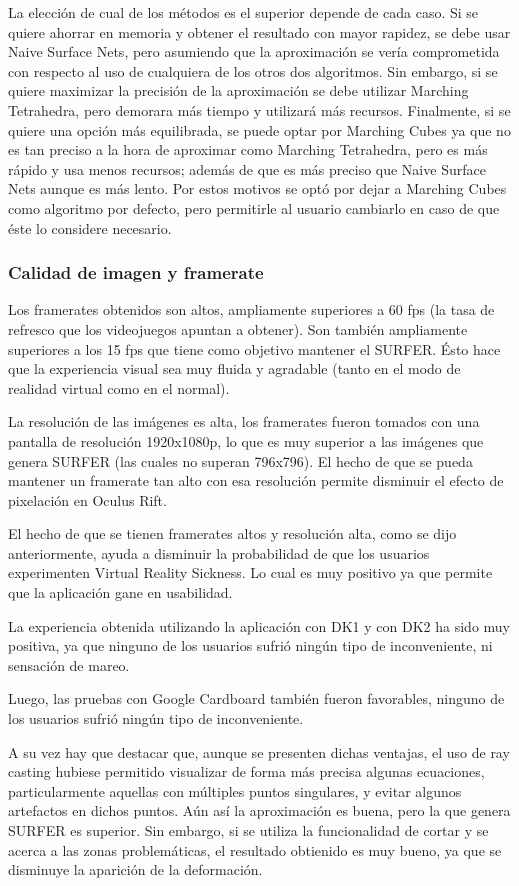 \documentclass[12pt]{article}
\begin{document}
La elección de cual de los métodos es el superior depende de cada caso. Si se quiere ahorrar en memoria y obtener el resultado con mayor rapidez, se debe usar Naive Surface Nets, pero asumiendo que la aproximación se vería comprometida con respecto al uso de cualquiera de los otros dos algoritmos. Sin embargo, si se quiere maximizar la precisión de la aproximación se debe utilizar Marching Tetrahedra, pero demorara más tiempo y utilizará más recursos. Finalmente, si se quiere una opción más equilibrada, se puede optar por Marching Cubes ya que no es tan preciso a la hora de aproximar como Marching Tetrahedra, pero es más rápido y usa menos recursos; además de que es más preciso que Naive Surface Nets aunque es más lento. Por estos motivos se optó por dejar a Marching Cubes como algoritmo por defecto, pero permitirle al usuario cambiarlo en caso de que éste lo considere necesario.
\subsubsection{Calidad de imagen y framerate}
\noindent Los framerates obtenidos son altos, ampliamente superiores a 60 fps (la tasa de refresco que los videojuegos apuntan a obtener). Son también ampliamente superiores a los 15 fps que tiene como objetivo mantener el SURFER. Ésto hace que la experiencia visual sea muy fluida y agradable (tanto en el modo de realidad virtual como en el normal). 

La resolución de las imágenes es alta, los framerates fueron tomados con una pantalla de resolución 1920x1080p, lo que es muy superior a las imágenes que genera SURFER (las cuales no superan 796x796). El hecho de que se pueda mantener un framerate tan alto con esa resolución permite disminuir el efecto de pixelación en Oculus Rift. 

El hecho de que se tienen framerates altos y resolución alta, como se dijo anteriormente, ayuda a disminuir la probabilidad de que los usuarios experimenten Virtual Reality Sickness. Lo cual es muy positivo ya que permite que la aplicación gane en usabilidad.

La experiencia obtenida utilizando la aplicación con DK1 y con DK2 ha sido muy positiva, ya que ninguno de los usuarios sufrió ningún tipo de inconveniente, ni sensación de mareo. 

Luego, las pruebas con Google Cardboard también fueron favorables, ninguno de los usuarios sufrió ningún tipo de inconveniente.

A su vez hay que destacar que, aunque se presenten dichas ventajas, el uso de ray casting hubiese permitido visualizar de forma más precisa algunas ecuaciones, particularmente aquellas con múltiples puntos singulares, y evitar algunos artefactos en dichos puntos. Aún así la aproximación es buena, pero la que genera SURFER es superior. Sin embargo, si se utiliza la funcionalidad de cortar y se acerca a las zonas problemáticas, el resultado obtienido es muy bueno, ya que se disminuye la aparición de la deformación.
\end{document}
